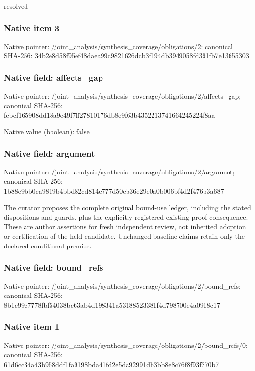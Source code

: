 \documentclass[10pt,a4paper]{article}
\begin{document}
\begingroup\raggedright\sloppy resolved\par\endgroup

\subsubsection{Native item 3}
Native pointer: /joint\_\allowbreak{}analysis/synthesis\_\allowbreak{}coverage/obligations/2; canonical SHA-256: 34b2e8d58f95ef48daea99c9821626dcb3f194db3949058fd391fb7e13655303

\subsubsection{Native field: affects\_\allowbreak{}gap}
Native pointer: /joint\_\allowbreak{}analysis/synthesis\_\allowbreak{}coverage/obligations/2/affects\_\allowbreak{}gap; canonical SHA-256: fcbcf165908dd18a9e49f7ff27810176db8e9f63b4352213741664245224f8aa

Native value (boolean): false

\subsubsection{Native field: argument}
Native pointer: /joint\_\allowbreak{}analysis/synthesis\_\allowbreak{}coverage/obligations/2/argument; canonical SHA-256: 1b88e9bb0ca9819b4bbd82cd814e777d50cb36e29e0a0b006bf4d2f476b3a687

\begingroup\raggedright\sloppy The curator proposes the complete original bound-use ledger,\allowbreak{} including the stated dispositions and guards,\allowbreak{} plus the explicitly registered existing proof consequence. These are author assertions for fresh independent review,\allowbreak{} not inherited adoption or certification of the held candidate. Unchanged baseline claims retain only the declared conditional premise.\par\endgroup

\subsubsection{Native field: bound\_\allowbreak{}refs}
Native pointer: /joint\_\allowbreak{}analysis/synthesis\_\allowbreak{}coverage/obligations/2/bound\_\allowbreak{}refs; canonical SHA-256: 8b1c99c7778fbf54038bc63ab4d198341a53188523381f4d798700e4a0918c17

\subsubsection{Native item 1}
Native pointer: /joint\_\allowbreak{}analysis/synthesis\_\allowbreak{}coverage/obligations/2/bound\_\allowbreak{}refs/0; canonical SHA-256: 61d6cc34a43b958ddf1fa9198bda41fd2e5da92991db3bb8e8c76f8f93f370b7
\end{document}
